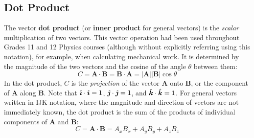 \documentclass{../../../oss-handout}
\newcommand{\iii}{\ensuremath\hat{\bm{\imath}}}
\newcommand{\jjj}{\ensuremath\hat{\bm{\jmath}}}
\newcommand{\kkk}{\ensuremath\hat{\bm{k}}}
\begin{document}
\subsection{Dot Product}
The vector \textbf{dot product} (or \textbf{inner product} for general vectors)
is the \emph{scalar} multiplication of two vectors. This vector operation had
been used throughout Grades 11 and 12 Physics courses (although without
explicitly referring using this notation), for example, when calculating
mechanical work. It is determined by the magnitude of the two vectors and the
cosine of the angle $\theta$ between them:
\begin{equation*}
  C=\bm{A}\cdot\bm{B}=\bm{B}\cdot\bm{A}=|\bm{A}||\bm{B}|\cos\theta
\end{equation*}
In the dot product, $C$ is the \emph{projection} of the vector $\bm{A}$ onto
$\bm{B}$, or the component of $\bm{A}$ along $\bm{B}$. Note that
$\iii\cdot\iii=1$, $\jjj\cdot\jjj=1$, and $\kkk\cdot\kkk=1$. For general
vectors written in IJK notation, where the magnitude and direction of vectors
are not immediately known, the dot product is the sum of the products of
individual components of $\bm{A}$ and $\bm{B}$:
\begin{equation*}
  C=\bm{A}\cdot\bm{B}=A_xB_x+A_yB_y+A_zB_z
\end{equation*}
\end{document}
